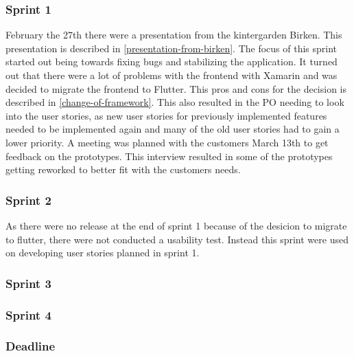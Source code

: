 \subsubsection{Sprint 1}
February the 27th there were a presentation from the kintergarden Birken.
This presentation is described in \autoref{presentation-from-birken}.
The focus of this sprint started out being towards fixing bugs and stabilizing the application.
It turned out that there were a lot of problems with the frontend with Xamarin and was decided to migrate the frontend to Flutter.
This pros and cons for the decision is described in \autoref{change-of-framework}.
This also resulted in the PO needing to look into the user stories, as new user stories for previously implemented features needed to be implemented again and many of the old user stories had to gain a lower priority.
A meeting was planned with the customers March 13th to get feedback on the prototypes. 
This interview resulted in some of the prototypes getting reworked to better fit with the customers needs.


\subsubsection{Sprint 2}
As there were no release at the end of sprint 1 because of the desicion to migrate to flutter, there were not conducted a usability test.
Instead this sprint were used on developing user stories planned in sprint 1.



\subsubsection{Sprint 3}

\subsubsection{Sprint 4}
\subsubsection{Deadline}
